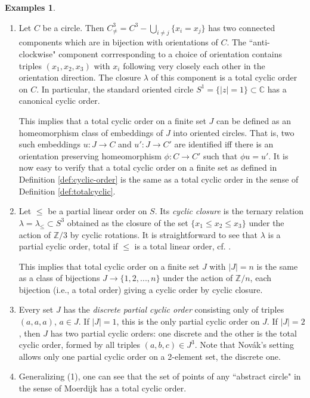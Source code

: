 \documentclass[english,11pt,leqno]{article}
\def\CC{\mathbb{C}}
\def\ZZ{\mathbb{Z}}
\theoremstyle{definition}
\newtheorem{exas}[thm]{Examples}
\theoremstyle{remark}
\numberwithin{equation}{section}
\begin{document}
\begin{exas}\label{ex:cyclic-orders}
\begin{enumerate}
\item Let $C$ be a circle.
Then $C^3_\neq = C^3-\bigcup_{i\neq j} \{x_i=x_j\}$ has two connected components which are
in bijection with  orientations of $C$. The ``anti-clockwise" component corrresponding to a
choice of orientation contains triples $(x_1, x_2, x_3)$  with $x_i$ following very closely
each other in the orientation direction. The closure $\lambda$ of this component is a total
cyclic order on $C$.  In particular, the standard oriented circle $S^1 =
\{|z|=1\}\subset\CC$ has a canonical cyclic order. 
 
This implies that a total cyclic order on a finite set $J$ can be defined as an  homeomorphism class
of embeddings of $J$ into oriented circles. That is, two such embeddings $u: J\to C$  and $u':J\to
C'$  are identified  iff there is an orientation preserving homeomorphism $\phi: C\to C'$ such that
$\phi u=u'$. It is now easy to verify that a total cyclic order on a finite set as defined in 
Definition \ref{def:cyclic-order} is the same as a total cyclic order in the sense of Definition
\ref{def:totalcyclic}.
 
\item Let $\leq$ be a partial linear order on $S$. Its {\em cyclic closure} is the ternary relation
$\lambda=\lambda_\leq\subset S^3$ obtained as the closure of the set $\{x_1\leq x_2\leq x_3\}$ under
the action of $\ZZ/3$ by cyclic rotations. It is straightforward to see that $\lambda$ is a partial
cyclic order, total if $\leq$ is a total linear order, cf. \cite[Th. 3.5]{novak}.  

This implies that total cyclic order on a finite set $J$ with $|J|=n$ is the same as a class of
bijections $J\to \{1, 2, ..., n\}$  under the action of $\ZZ/n$, each bijection (i.e., a total
order) giving a cyclic order by cyclic closure. 

\item Every set $J$ has the {\em discrete partial cyclic order} consisting only of triples
	$(a,a,a)$, $a\in J$. If $|J|=1$, this is the only partial cyclic order on $J$.  If $|J|=2$,
	then $J$ has two partial cyclic orders: one discrete and the other is the total cyclic
	order, formed by all triples $(a,b,c)\in J^3$.  Note that Nov\'ak's setting \cite{novak}
	allows only one partial cyclic order on a 2-element set, the discrete one. 
	
	\item Generalizing (1), one can see that the set of points of any ``abstract circle"
	in the sense of Moerdijk \cite{moerdijk} has a total cyclic order.
	
\end{enumerate}
\end{exas}
 
\end{document}
